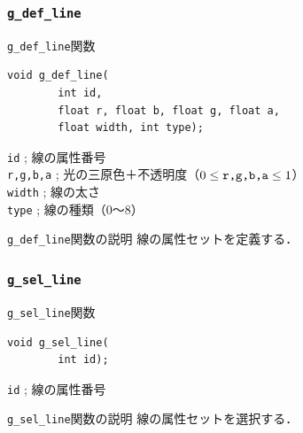 \documentclass[platex,a4paper,12pt]{jsarticle}%
\begin{document}
\subsubsection{\texttt{g\_def\_line}}

\begin{itembox}[l]{\texttt{g\_def\_line}関数}
\begin{verbatim}
void g_def_line(
        int id,	
        float r, float b, float g, float a,
        float width, int type);
\end{verbatim}
\verb|id| ; 線の属性番号\\
\verb|r,g,b,a| ; 光の三原色＋不透明度（$0\leq \verb|r,g,b,a| \leq 1$）\\
\verb|width| ; 線の太さ\\
\verb|type| ; 線の種類（0〜8）\\
\end{itembox}

\begin{itembox}[l]{\texttt{g\_def\_line}関数の説明}
線の属性セットを定義する．
\end{itembox}

\begin{figure}[htb]
\end{figure}



\clearpage
\subsubsection{\texttt{g\_sel\_line}}

\begin{itembox}[l]{\texttt{g\_sel\_line}関数}
\begin{verbatim}
void g_sel_line(
        int id);
\end{verbatim}
\verb|id| ; 線の属性番号\\
\end{itembox}

\begin{itembox}[l]{\texttt{g\_sel\_line}関数の説明}
線の属性セットを選択する．
\end{itembox}
\end{document}

